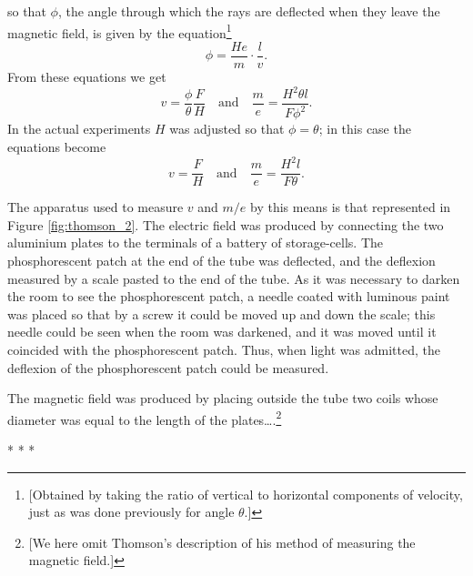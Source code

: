 %
so that $\phi$, the angle through which the rays are deflected when
they leave the magnetic field, is given by the equation\footnote{{[}Obtained by taking the ratio of vertical to horizontal
  components of velocity, just as was done previously for angle
  $\theta$.{]}}
%
\begin{equation*}
\phi = \frac{He}{m} \cdot \frac{l}{v}.
\end{equation*}
%
From these equations we get
\begin{equation*}
v = \frac{\phi}{\theta} \frac{F}{H} \quad \text{and} \quad \frac{m}{e} = \frac{H^{2}\theta l}{F\phi^2}.
\end{equation*}
In the actual experiments $H$ was adjusted so that $\phi =\theta$; in this case the equations become
\begin{equation*}
v = \frac{F}{H} \quad \text{and} \quad 
\frac{m}{e} = \frac{H^{2}l}{F\theta}.
\end{equation*}

The apparatus used to measure $v$ and $m/e$ by this means is
that represented in Figure \ref{fig:thomson_2}. The electric field was produced by
connecting the two aluminium plates to the terminals of a battery of
storage-cells. The phosphorescent patch at the end of the tube was
deflected, and the deflexion measured by a scale pasted to the end of
the tube. As it was necessary to darken the room to see the
phosphorescent patch, a needle coated with luminous paint was placed so
that by a screw it could be moved up and down the scale; this needle
could be seen when the room was darkened, and it was moved until it
coincided with the phosphorescent patch. Thus, when light was admitted,
the deflexion of the phosphorescent patch could be measured.

The magnetic field was produced by placing outside the tube two coils
whose diameter was equal to the length of the plates\ldots.\footnote{{[}We here 
  omit Thomson's description of his method of measuring the magnetic
  field.{]}}\\
\centerline{* * *}

